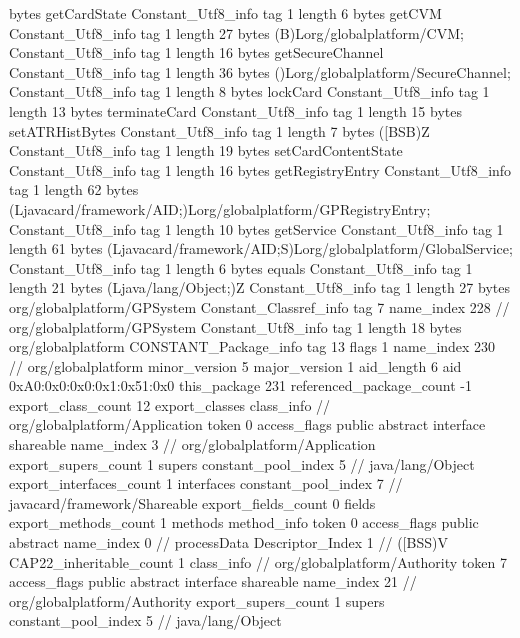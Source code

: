 {{{			bytes	getCardState
		}
		Constant_Utf8_info {
			tag	1
			length	6
			bytes	getCVM
		}
		Constant_Utf8_info {
			tag	1
			length	27
			bytes	(B)Lorg/globalplatform/CVM;
		}
		Constant_Utf8_info {
			tag	1
			length	16
			bytes	getSecureChannel
		}
		Constant_Utf8_info {
			tag	1
			length	36
			bytes	()Lorg/globalplatform/SecureChannel;
		}
		Constant_Utf8_info {
			tag	1
			length	8
			bytes	lockCard
		}
		Constant_Utf8_info {
			tag	1
			length	13
			bytes	terminateCard
		}
		Constant_Utf8_info {
			tag	1
			length	15
			bytes	setATRHistBytes
		}
		Constant_Utf8_info {
			tag	1
			length	7
			bytes	([BSB)Z
		}
		Constant_Utf8_info {
			tag	1
			length	19
			bytes	setCardContentState
		}
		Constant_Utf8_info {
			tag	1
			length	16
			bytes	getRegistryEntry
		}
		Constant_Utf8_info {
			tag	1
			length	62
			bytes	(Ljavacard/framework/AID;)Lorg/globalplatform/GPRegistryEntry;
		}
		Constant_Utf8_info {
			tag	1
			length	10
			bytes	getService
		}
		Constant_Utf8_info {
			tag	1
			length	61
			bytes	(Ljavacard/framework/AID;S)Lorg/globalplatform/GlobalService;
		}
		Constant_Utf8_info {
			tag	1
			length	6
			bytes	equals
		}
		Constant_Utf8_info {
			tag	1
			length	21
			bytes	(Ljava/lang/Object;)Z
		}
		Constant_Utf8_info {
			tag	1
			length	27
			bytes	org/globalplatform/GPSystem
		}
		Constant_Classref_info {
			tag	7
			name_index	228		// org/globalplatform/GPSystem
		}
		Constant_Utf8_info {
			tag	1
			length	18
			bytes	org/globalplatform
		}
		CONSTANT_Package_info {
			tag	13
			flags	1
			name_index	230		// org/globalplatform
			minor_version	5
			major_version	1
			aid_length	6
			aid	0xA0:0x0:0x0:0x1:0x51:0x0
		}
	}
	this_package	231
	referenced_package_count	-1
	export_class_count	12
	export_classes {
		class_info {		// org/globalplatform/Application
			token	0
			access_flags	public abstract interface shareable
			name_index	3		// org/globalplatform/Application
			export_supers_count	1
			supers {
				constant_pool_index	5		// java/lang/Object
			}
			export_interfaces_count	1
			interfaces {
				constant_pool_index	7		// javacard/framework/Shareable
			}
			export_fields_count	0
			fields {
			}
			export_methods_count	1
			methods {
				method_info {
					token	0
					access_flags	public abstract
					name_index	0		// processData
					Descriptor_Index	1		// ([BSS)V
				}
			}
			CAP22_inheritable_count	1
		}
		class_info {		// org/globalplatform/Authority
			token	7
			access_flags	public abstract interface shareable
			name_index	21		// org/globalplatform/Authority
			export_supers_count	1
			supers {
				constant_pool_index	5		// java/lang/Object
}}}}
